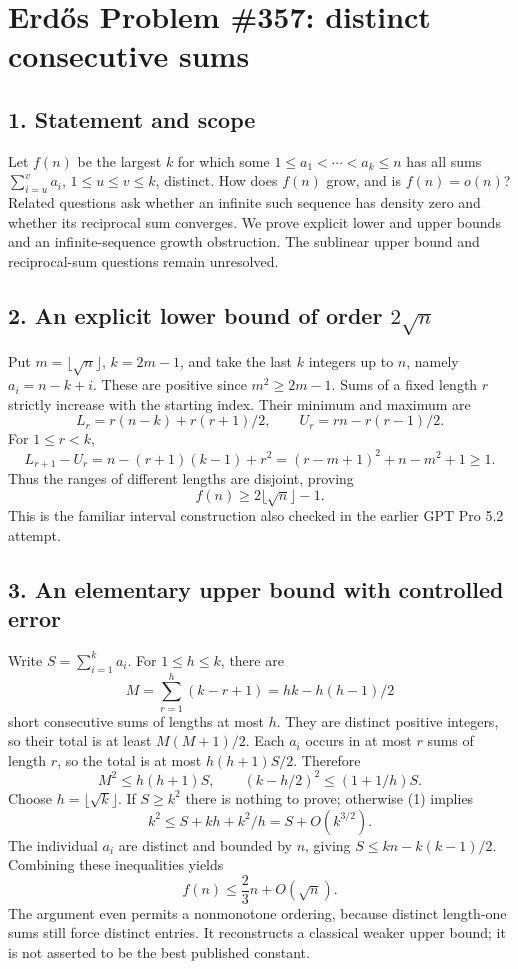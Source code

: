 \section*{Erd\H{o}s Problem \#357: distinct consecutive sums}
\subsection*{1. Statement and scope}
Let $f(n)$ be the largest $k$ for which some
$1\le a_1<\cdots<a_k\le n$ has all sums
$\sum_{i=u}^v a_i$, $1\le u\le v\le k$, distinct.
How does $f(n)$ grow, and is $f(n)=o(n)$?
Related questions ask whether an infinite such sequence has density
zero and whether its reciprocal sum converges.
We prove explicit lower and upper bounds and an infinite-sequence
growth obstruction. The sublinear upper bound and reciprocal-sum
questions remain unresolved.

\subsection*{2. An explicit lower bound of order $2\sqrt n$}
Put $m=\lfloor\sqrt n\rfloor$, $k=2m-1$, and take the last $k$ integers
up to $n$, namely $a_i=n-k+i$. These are positive since
$m^2\ge2m-1$. Sums of a fixed length $r$ strictly increase with the
starting index. Their minimum and maximum are
\[
 L_r=r(n-k)+r(r+1)/2,\qquad U_r=rn-r(r-1)/2.
\]
For $1\le r<k$,
\[
 L_{r+1}-U_r
 =n-(r+1)(k-1)+r^2
 =(r-m+1)^2+n-m^2+1\ge1.
\]
Thus the ranges of different lengths are disjoint, proving
\[
 f(n)\ge2\lfloor\sqrt n\rfloor-1.
\]
This is the familiar interval construction also checked in the
earlier GPT Pro 5.2 attempt.

\subsection*{3. An elementary upper bound with controlled error}
Write $S=\sum_{i=1}^k a_i$. For $1\le h\le k$, there are
\[
 M=\sum_{r=1}^h(k-r+1)=hk-h(h-1)/2
\]
short consecutive sums of lengths at most $h$. They are distinct
positive integers, so their total is at least $M(M+1)/2$.
Each $a_i$ occurs in at most $r$ sums of length $r$, so the total is
at most $h(h+1)S/2$. Therefore
\[
 M^2\le h(h+1)S,\qquad
 (k-h/2)^2\le(1+1/h)S.                            \tag{1}
\]
Choose $h=\lfloor\sqrt k\rfloor$. If $S\ge k^2$ there is nothing
to prove; otherwise (1) implies
\[
 k^2\le S+kh+k^2/h=S+O(k^{3/2}).
\]
The individual $a_i$ are distinct and bounded by $n$, giving
$S\le kn-k(k-1)/2$. Combining these inequalities yields
\[
 f(n)\le\frac23 n+O(\sqrt n).                      \tag{2}
\]
The argument even permits a nonmonotone ordering, because distinct
length-one sums still force distinct entries. It reconstructs a
classical weaker upper bound; it is not asserted to be the best
published constant.

